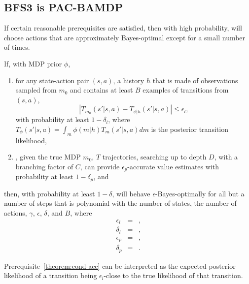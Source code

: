 \subsection{BFS3 is PAC-BAMDP}
\label{sec:bfs3:pac-bamdp-informal}

If certain reasonable prerequisites are satisfied, then with high probability,  will choose actions that are approximately Bayes-optimal except for a small number of times.
\begin{thm}
If, with MDP prior $\phi$,
\begin{enumerate}
\item
\label{theorem:cond-acc} 
for any state-action pair $(s,a)$, a history $h$ that is made of observations sampled from $m_0$ and contains at least $B$ examples of transitions from $(s, a)$,
$$\left|T_{m_0}(s'|s,a) - T_{\phi|h}(s'|s,a)\right| \leq \epsilon_l,$$
with probability at least $1-\delta_l$,
where $T_{\phi}(s'|s,a) =\int_m \phi(m|h) T_m(s'|s,a) dm$ is the posterior transition likelihood,
\item
\label{theorem:cond-fsss}
, given the true MDP $m_0$, $T$ trajectories, searching up to depth $D$, with a branching factor of $C$, can provide $\epsilon_p$-accurate value estimates with probability at least $1-\delta_p$, and 
\end{enumerate}
then, with probability at least $1-\delta$,  will behave $\epsilon$-Bayes-optimally for all but a number of steps that is polynomial with the number of states, the number of actions, $\gamma$, $\epsilon$, $\delta$, and $B$, where
\begin{eqnarray}
\epsilon_l &=&,\\
\delta_l &=&,\\
\epsilon_p &=&,\\
\delta_p &=&.
\end{eqnarray}
\end{thm}

Prerequisite~\ref{theorem:cond-acc} can be interpreted as the expected posterior likelihood of a transition being $\epsilon_l$-close to the true likelihood of that transition.

